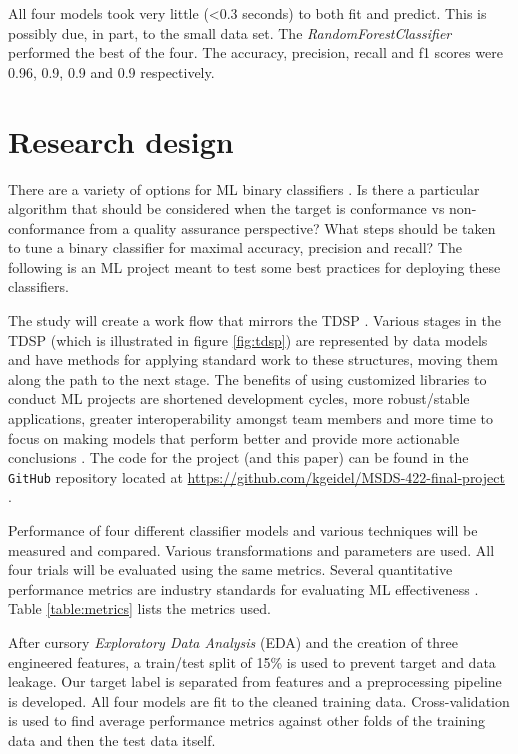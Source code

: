 \documentclass[11pt,letterpaper]{article}
\begin{document}
All four models took very little (\textless 0.3 seconds) to both fit and predict. This is possibly due, in part, to the small data set. The \emph{RandomForestClassifier} performed the best of the four. The accuracy, precision, recall and f1 scores were 0.96, 0.9, 0.9 and 0.9 respectively.
\section{Research design}
\tab There are a variety of options for ML binary classifiers \citep[ch 3]{Geron:2023}. Is there a particular algorithm that should be considered when the target is conformance vs non-conformance from a quality assurance perspective? What steps should be taken to tune a binary classifier for maximal accuracy, precision and recall? The following is an ML project meant to test some best practices for deploying these classifiers.

The study will create a work flow that mirrors the TDSP \citep{tdsp:2024}. Various stages in the TDSP (which is illustrated in figure \ref{fig:tdsp}) are represented by data models and have methods for applying standard work to these structures, moving them along the path to the next stage.
The benefits of using customized libraries to conduct ML projects are shortened development cycles, more robust/stable applications, greater interoperability amongst team members and more time to focus on making models that perform better and provide more actionable conclusions \citep{Geron:2023}. The code for the project (and this paper) can be found in the \texttt{GitHub} repository located at \url{https://github.com/kgeidel/MSDS-422-final-project} \citep{GeidelRepo:2024}.

Performance of four different classifier models and various techniques will be measured and compared. Various transformations and parameters are used. All four trials will be evaluated using the same metrics. Several quantitative performance metrics are industry standards for evaluating ML effectiveness \citep{Powers:2007}. Table \ref{table:metrics} lists the metrics used.

After cursory \emph{Exploratory Data Analysis} (EDA) and the creation of three engineered features, a train/test split of 15\% is used to prevent target and data leakage. Our target label is separated from features and a preprocessing pipeline is developed. All four models are fit to the cleaned training data. Cross-validation is used to find average performance metrics against other folds of the training data and then the test data itself.
\end{document}
